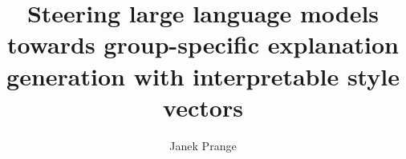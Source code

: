 \documentclass[]{proposalclass}
\title{Steering large language models towards group-specific explanation generation with interpretable style vectors}
\author{Janek Prange}
\begin{document}
\maketitle
\tableofcontents
\newpage




\clearpage

{\footnotesize}%
\end{document}
